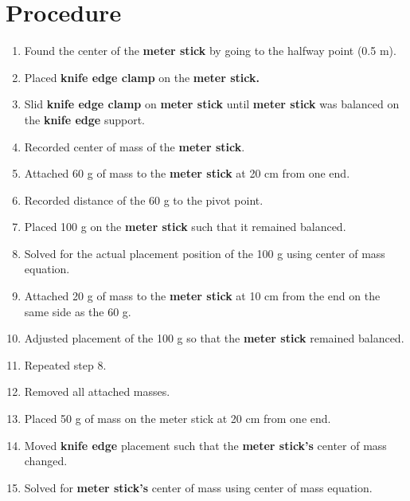 
\section{Procedure}
\vspace{-0.5cm}
\singlespacing



\begin{enumerate}
		\item Found the center of the \textbf{meter stick} by going to the halfway
			point (0.5 m).

		\item Placed \textbf{knife edge clamp }on the \textbf{meter stick.}

		\item Slid \textbf{knife edge clamp }on \textbf{meter stick }until \textbf{meter
			stick }was balanced on the \textbf{knife edge }support.

		\item Recorded center of mass of the \textbf{meter stick}.

		\item Attached 60 g of mass to the \textbf{meter stick} at 20 cm from one
			end.

		\item Recorded distance of the 60 g to the pivot point.

		\item Placed 100 g on the \textbf{meter stick }such that it remained balanced.

		\item Solved for the actual placement position of the 100 g using center of mass
			equation.

		\item Attached 20 g of mass to the \textbf{meter stick }at 10 cm from the end
			on the same side as the 60 g.

		\item Adjusted placement of the 100 g so that the \textbf{meter stick }remained
			balanced.

		\item Repeated step 8.

		\item Removed all attached masses.

		\item Placed 50 g of mass on the meter stick at 20 cm from one end.

		\item Moved \textbf{knife edge }placement such that the \textbf{meter stick's
			}center of mass changed.

		\item Solved for \textbf{meter stick's }center of mass using center of mass equation.
	\end{enumerate}


\newpage




